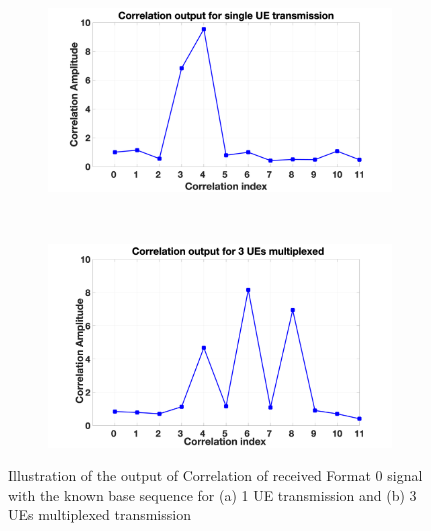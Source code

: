 \documentclass[journal]{IEEEtran}
\begin{document}
\begin{figure}[h]
    \captionsetup{justification=justified}
     \centering
     \begin{subfigure}[b]{0.48\textwidth}
         \centering
         \includegraphics[width=\textwidth]{Figures/correlation_1_ue.png}
         \caption{}
         \label{fig: correlation_1_ue}
     \end{subfigure}
     \\
     \begin{subfigure}[b]{0.48\textwidth}
         \centering
         \includegraphics[width=\textwidth]{Figures/correlation_3_ue.png}
         \caption{}
         \label{fig: correlation_3_ue}
     \end{subfigure}
        \caption{Illustration of the output of Correlation of received Format 0 signal with the known base sequence for (a) 1 UE transmission and (b) 3 UEs multiplexed transmission}
        \label{fig: correlation_plots}
\end{figure}
\end{document}
